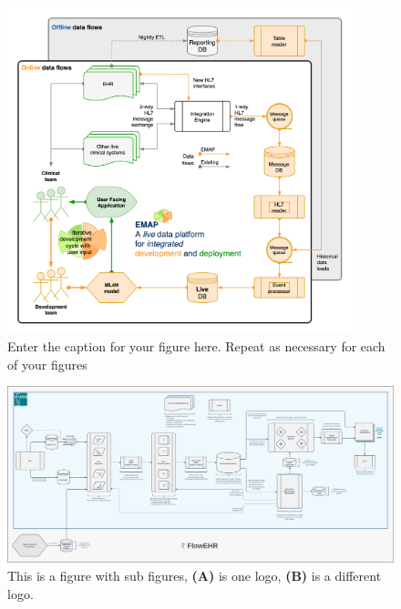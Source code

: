 \documentclass[utf8]{FrontiersinVancouver}
\begin{document}
\begin{figure}[h!]
\begin{center}
\includegraphics[width=10cm]{figs/emap.png}%
\end{center}
\caption{ Enter the caption for your figure here.  Repeat as  necessary for each of your figures}\label{fig:1}
\end{figure}


\begin{figure}[h!]
\begin{center}
\includegraphics[width=15cm]{figs/flowehr.png}
\end{center}
\caption{This is a figure with sub figures, \textbf{(A)} is one logo, \textbf{(B)} is a different logo.}\label{fig:2}
\end{figure}

\end{document}
